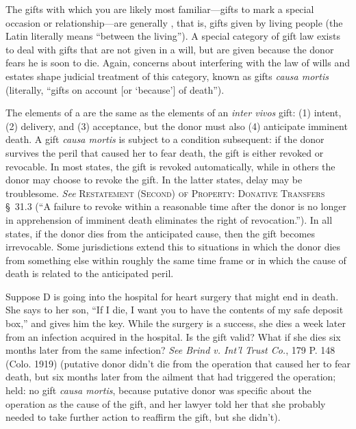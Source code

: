 The gifts with which you are likely most familiar---gifts to mark a special
occasion or relationship---are generally , that is,
gifts given by living people (the Latin literally means ``between the
living'').  A special category of gift law exists to deal with gifts that are
not given in a will, but are given because the donor fears he is soon to die. 
Again, concerns about interfering with the law of wills and estates shape
judicial treatment of this category, known as gifts \textit{causa mortis}
(literally, ``gifts on account [or `because'] of death'').

The elements of a  are the same as the elements of an
\textit{inter vivos} gift: (1) intent, (2) delivery, and (3) acceptance, but
the donor must also (4) anticipate imminent death. A gift \textit{causa mortis}
is subject to a condition subsequent: if the donor survives the peril that
caused her to fear death, the gift is either revoked or revocable.  In most
states, the gift is revoked automatically, while in others the donor may choose
to revoke the gift.  In the latter states, delay may be troublesome. 
\textit{See} \textsc{Restatement (Second) of Property: Donative Transfers}
\S~31.3 (``A
failure to revoke within a reasonable time after the donor is no longer in
apprehension of imminent death eliminates the right of revocation.'').  In all
states, if the donor dies from the anticipated cause, then the gift becomes
irrevocable.  Some jurisdictions extend this to situations in which the donor
dies from something else within roughly the same time frame or in which the
cause of death is related to the anticipated peril.

Suppose D is going into the hospital for heart surgery that might end in death. 
She says to her son, ``If I die, I want you to have the contents of my safe
deposit box,'' and gives him the key.  While the surgery is a success, she dies
a week later from an infection acquired in the hospital.  Is the gift valid?
What if she dies six months later from the same infection?  \emph{See Brind v. Int'l
Trust Co.}, 179 P. 148 (Colo. 1919) (putative donor didn't die from the
operation that caused her to fear death, but six months later from the ailment
that had triggered the operation; held: no gift \textit{causa mortis}, because
putative donor was specific about the operation as the cause of the gift, and
her lawyer told her that she probably needed to take further action to reaffirm
the gift, but she didn't).  

